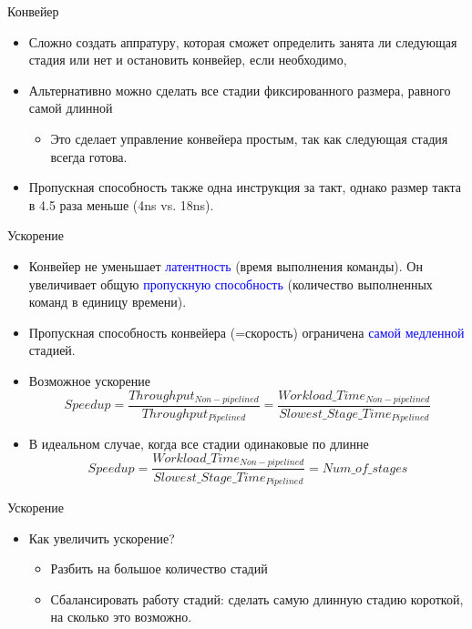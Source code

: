\begin{frame}{Конвейер}
\begin{itemize}
    \item Сложно создать аппратуру, которая сможет определить занята ли следующая стадия или нет и остановить конвейер, если необходимо,
    \item Альтернативно можно сделать все стадии фиксированного размера, равного самой длинной
    \begin{itemize}
        \item Это сделает управление конвейера простым, так как следующая стадия всегда готова.
    \end{itemize}
\end{itemize}
\centering
{}
\begin{itemize}
    \item Пропускная способность также одна инструкция за такт, однако размер такта в 4.5 раза меньше (4ns vs. 18ns).
\end{itemize}
\end{frame}

\begin{frame}{Ускорение}
\begin{itemize}
    \item Конвейер не уменьшает \textcolor{blue}{латентность} (время выполнения команды). Он увеличивает общую \textcolor{blue}{пропускную способность} (количество выполненных команд в единицу времени).\pause
    \item Пропускная способность конвейера (=скорость) ограничена \textcolor{blue}{самой медленной} стадией.\pause
    \item Возможное ускорение
    \begin{displaymath}
    Speedup = \frac{Throughput_{Non-pipelined}}{Throughput_{Pipelined}} = \frac{Workload\_Time_{Non-pipelined}}{Slowest\_Stage\_Time_{Pipelined}}
    \end{displaymath}\pause
    \item В идеальном случае, когда все стадии одинаковые по длинне
    \begin{displaymath}
    Speedup = \frac{Workload\_Time_{Non-pipelined}}{Slowest\_Stage\_Time_{Pipelined}} = Num\_of\_stages
    \end{displaymath}
\end{itemize}
\end{frame}

\begin{frame}{Ускорение}
\begin{itemize}
    \item Как увеличить ускорение?\pause
    \begin{itemize}
        \item Разбить на большое количество стадий\pause
        \item Сбалансировать работу стадий: сделать самую длинную стадию короткой, на сколько это возможно.
    \end{itemize}
\end{itemize}
\end{frame}

